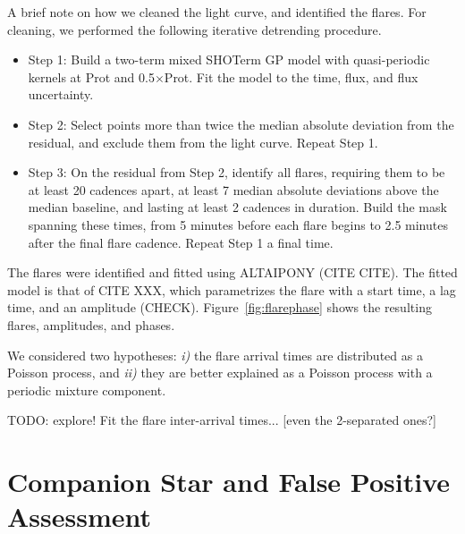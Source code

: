 \documentclass[12pt,modern,tighten]{aastex63}
\begin{document}
A brief note on how we cleaned the light curve, and identified the
flares.
For cleaning, we performed the following iterative detrending procedure.
\begin{itemize}
  \item Step 1: Build a two-term mixed SHOTerm GP model with
    quasi-periodic kernels at Prot and 0.5$\times$Prot. Fit the model
    to the time, flux, and flux uncertainty.
  \item Step 2: Select points more than twice the median absolute
    deviation from the residual, and exclude them from the light
    curve.  Repeat Step 1.
  \item Step 3: On the residual from Step 2, identify all flares,
    requiring them to be at least 20 cadences apart, at least 7 median
    absolute deviations above the median baseline, and lasting at least
    2 cadences in duration.  Build the mask spanning these times, from
    5 minutes before each flare begins to 2.5 minutes after the final
    flare cadence.  Repeat Step 1 a final time.
\end{itemize}

The flares were identified and fitted using ALTAIPONY (CITE CITE).
The fitted model is that of CITE XXX, which parametrizes the flare
with a start time, a lag time, and an amplitude (CHECK).
Figure~\ref{fig:flarephase} shows the resulting flares, amplitudes,
and phases.

We considered two hypotheses: {\it i)} the flare arrival times are
distributed as a Poisson process, and {\it ii)} they are better
explained as a Poisson process with a periodic mixture component.

TODO: explore!  Fit the flare inter-arrival times...
[even the 2-separated ones?]





\section{Companion Star and False Positive Assessment}
\label{app:companionstar}
\end{document}
